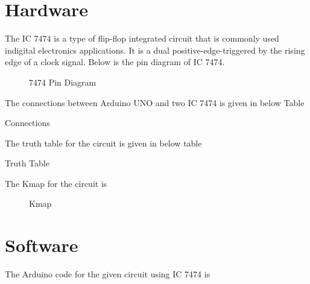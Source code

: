 \documentclass{article}
\begin{document}
\section{Hardware}
	The IC 7474 is a type of flip-flop integrated circuit that is commonly used indigital electronics applications. It is a dual positive-edge-triggered by the rising edge of a clock signal. Below is the pin diagram of IC 7474. \\
	\begin{figure}[h]
		\centering
	
		\caption{7474 Pin Diagram}
		\label{fig:2}
	\end{figure}

	The connections between Arduino UNO and two IC 7474 is given in below Table \\
	\begin{table}[h]
	\begin{center}
	
	\end{center}
		\caption{Connections}
		\label{table:1}
	\end{table}

	The truth table for the circuit is given in below table \\
	\begin{table}[h]
		\begin{center}
	
		\caption{Truth Table}
		\label{table:2}
		\end{center}
	\end{table}
	
	The Kmap for the circuit is \\
	\begin{figure}[h]
		\centering
	
	\caption{Kmap}
	\label{fig:3}
	\end{figure}

\section{Software}
	The Arduino code for the given circuit using IC 7474 is \\
	
\end{document}

